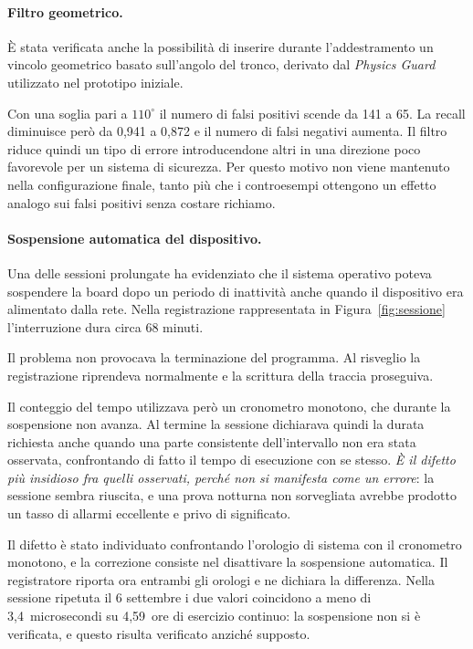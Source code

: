 \paragraph{Filtro geometrico.}

È stata verificata anche la possibilità di inserire durante l'addestramento un vincolo geometrico basato sull'angolo del tronco, derivato dal \emph{Physics Guard} utilizzato nel prototipo iniziale.

Con una soglia pari a $110^\circ$ il numero di falsi positivi scende da 141 a 65. La recall diminuisce però da 0,941 a 0,872 e il numero di falsi negativi aumenta. Il filtro riduce quindi un tipo di errore introducendone altri in una direzione poco favorevole per un sistema di sicurezza. Per questo motivo non viene mantenuto nella configurazione finale, tanto più che i controesempi ottengono un effetto analogo sui falsi positivi senza costare richiamo.

\paragraph{Sospensione automatica del dispositivo.}

Una delle sessioni prolungate ha evidenziato che il sistema operativo poteva sospendere la board dopo un periodo di inattività anche quando il dispositivo era alimentato dalla rete. Nella registrazione rappresentata in Figura~\ref{fig:sessione} l'interruzione dura circa 68 minuti.

Il problema non provocava la terminazione del programma. Al risveglio la registrazione riprendeva normalmente e la scrittura della traccia proseguiva.

Il conteggio del tempo utilizzava però un cronometro monotono, che durante la sospensione non avanza. Al termine la sessione dichiarava quindi la durata richiesta anche quando una parte consistente dell'intervallo non era stata osservata, confrontando di fatto il tempo di esecuzione con se stesso. \emph{È il difetto più insidioso fra quelli osservati, perché non si manifesta come un errore}: la sessione sembra riuscita, e una prova notturna non sorvegliata avrebbe prodotto un tasso di allarmi eccellente e privo di significato.

Il difetto è stato individuato confrontando l'orologio di sistema con il cronometro monotono, e la correzione consiste nel disattivare la sospensione automatica. Il registratore riporta ora entrambi gli orologi e ne dichiara la differenza. Nella sessione ripetuta il 6 settembre i due valori coincidono a meno di 3,4~microsecondi su 4,59~ore di esercizio continuo: la sospensione non si è verificata, e questo risulta verificato anziché supposto.

